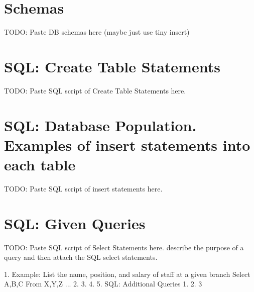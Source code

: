 \documentclass[letterpaper,11pt]{texMemo} %
\begin{document}
\maketitle %


\section*{Schemas}

TODO: Paste DB schemas here (maybe just use tiny insert)

%


\section*{SQL: Create Table Statements}
TODO: Paste SQL script of Create Table Statements here.

\section*{SQL: Database Population. Examples of insert statements into each table}

TODO: Paste SQL script of insert statements here.

\section*{SQL: Given Queries}

TODO: Paste SQL script of Select Statements here.
describe the purpose of a query and then attach the SQL select statements.

1.
Example: List the name, position, and salary of staff at a given branch
Select A,B,C 
From X,Y,Z ...
2.
3.
4.
5.
SQL: Additional Queries
1.
2.
3
\end{document}
